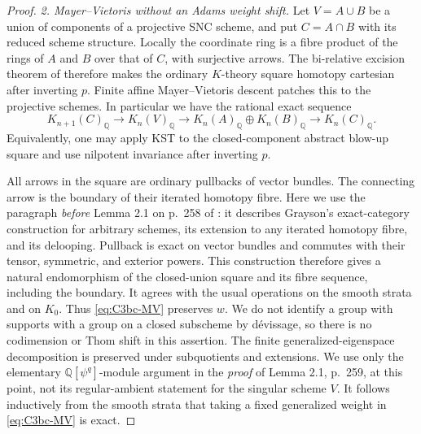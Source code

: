 \begin{proof}
\emph{2. Mayer--Vietoris without an Adams weight shift.}
Let \(V=A\cup B\) be a union of components of a projective SNC
scheme, and put \(C=A\cap B\) with its reduced scheme structure.
Locally the coordinate ring is a fibre product of the rings of
\(A\) and \(B\) over that of \(C\), with surjective arrows.
The bi-relative excision theorem of
\citet[Theorem C, p.~30]{rootGeisserHesselholt2011}
therefore makes the ordinary \(K\)-theory square homotopy
cartesian after inverting \(p\).
Finite affine Mayer--Vietoris descent
\citep[Theorem 8.1, p.~367]{D_ThomasonTrobaugh1990}
patches this to the projective schemes. In particular we have
the rational exact sequence
\begin{equation}\label{eq:C3bc-MV}
 K_{n+1}(C)_{\mathbb Q}\longrightarrow K_n(V)_{\mathbb Q}
 \longrightarrow K_n(A)_{\mathbb Q}\oplus K_n(B)_{\mathbb Q}
 \longrightarrow K_n(C)_{\mathbb Q}.
\end{equation}
Equivalently, one may apply KST to the closed-component abstract
blow-up square and use nilpotent invariance after inverting \(p\).

All arrows in the square are ordinary pullbacks of vector bundles.
The connecting arrow is the boundary of their iterated homotopy
fibre. Here we use the paragraph \emph{before} Lemma 2.1 on
p.~258 of \citet{frC3bcLevine1994}: it describes Grayson's
exact-category construction for arbitrary schemes, its extension
to any iterated homotopy fibre, and its delooping. Pullback is exact
on vector bundles and commutes with their tensor, symmetric, and
exterior powers. This construction therefore gives a natural
endomorphism of the closed-union square and its fibre sequence,
including the boundary. It agrees with the usual operations on
the smooth strata and on \(K_0\). Thus \eqref{eq:C3bc-MV}
preserves \(w\).
We do not identify a group with supports with a group on a closed
subscheme by d\'evissage, so there is no codimension or Thom shift
in this assertion. The finite generalized-eigenspace decomposition
is preserved under subquotients and extensions. We use only the
elementary \(\mathbb Q[\psi^q]\)-module argument in the
\emph{proof} of Lemma 2.1, p.~259, at this point, not its
regular-ambient statement for the singular scheme \(V\).
It follows inductively from the smooth strata that taking a fixed
generalized weight in \eqref{eq:C3bc-MV} is exact.


\end{proof}
